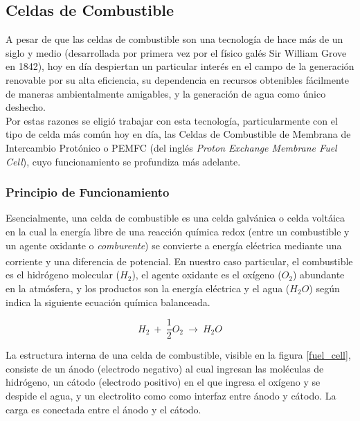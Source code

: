 \subsection{Celdas de Combustible}

A pesar de que las celdas de combustible son una tecnología de hace más de un siglo y medio (desarrollada por primera vez por el físico galés Sir William Grove en 1842), hoy en día despiertan un particular interés en el campo de la generación renovable por su alta eficiencia, su dependencia en recursos obtenibles fácilmente de maneras ambientalmente amigables, y la generación de agua como único deshecho.\\

Por estas razones se eligió trabajar con esta tecnología, particularmente con el tipo de celda más común hoy en día, las Celdas de Combustible de Membrana de Intercambio Protónico o PEMFC (del inglés \textit{Proton Exchange Membrane Fuel Cell}), cuyo funcionamiento se profundiza más adelante.\\

\subsubsection{Principio de Funcionamiento}

Esencialmente, una celda de combustible es una celda galvánica o celda voltáica en la cual la energía libre de una reacción química redox (entre un combustible y un agente oxidante o \textit{comburente}) se convierte a energía eléctrica mediante una corriente y una diferencia de potencial.\textsuperscript{\cite{FC-FundAndAppl}} En nuestro caso particular, el combustible es el hidrógeno molecular ($H_2$), el agente oxidante es el oxígeno ($O_2$) abundante en la atmósfera, y los productos son la energía eléctrica y el agua ($H_2O$) según indica la siguiente ecuación química balanceada.

\begin{equation}\label{redox_celda}
    H_2\ +\ \frac{1}{2}O_2\ \longrightarrow\ H_2O
\end{equation}

La estructura interna de una celda de combustible, visible en la figura \ref{fuel_cell}, consiste de un ánodo (electrodo negativo) al cual ingresan las moléculas de hidrógeno, un cátodo (electrodo positivo) en el que ingresa el oxígeno y se despide el agua, y un electrolito como como interfaz entre ánodo y cátodo. La carga es conectada entre el ánodo y el cátodo.\\

